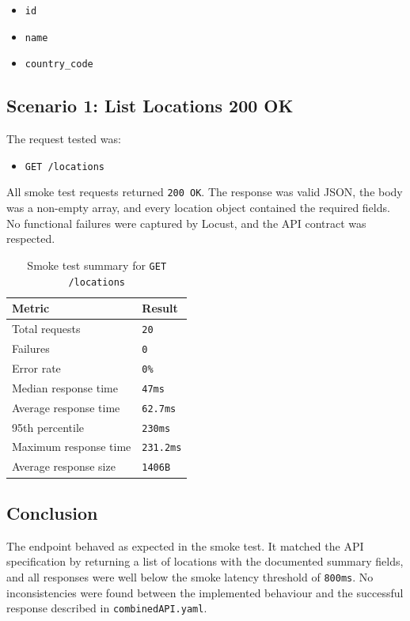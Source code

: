 \begin{itemize}
    \item \texttt{id}
    \item \texttt{name}
    \item \texttt{country\_code}
\end{itemize}

\subsection{Scenario 1: List Locations 200 OK}

The request tested was:

\begin{itemize}
    \item \texttt{GET /locations}
\end{itemize}

All smoke test requests returned \texttt{200 OK}. The response was valid JSON, the body was a non-empty array, and every location object contained the required fields. No functional failures were captured by Locust, and the API contract was respected.

\begin{table}[H]
    \centering
    \caption{Smoke test summary for \texttt{GET /locations}}
    \begin{tabular}{p{} p{}}
    \hline
    \textbf{Metric} & \textbf{Result} \\\hline
    Total requests & \texttt{20} \\
    Failures & \texttt{0} \\
    Error rate & \texttt{0\%} \\
    Median response time & \texttt{47ms} \\
    Average response time & \texttt{62.7ms} \\
    95th percentile & \texttt{230ms} \\
    Maximum response time & \texttt{231.2ms} \\
    Average response size & \texttt{1406B} \\\hline
    \end{tabular}
\end{table}

\subsection{Conclusion}

The endpoint behaved as expected in the smoke test. It matched the API specification by returning a list of locations with the documented summary fields, and all responses were well below the smoke latency threshold of \texttt{800ms}. No inconsistencies were found between the implemented behaviour and the successful response described in \texttt{combinedAPI.yaml}.

